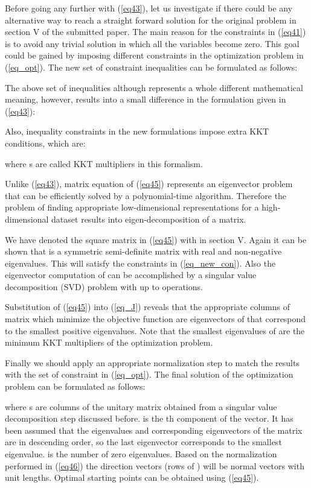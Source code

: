 \documentclass[10pt,journal,cspaper,compsoc]{IEEEtran}
\begin{document}
Before going any further with (\ref{eq43}), let us investigate if there could be any alternative way to reach a straight forward solution for the original problem in section V of the submitted paper. The main reason for the constraints in (\ref{eq41}) is to avoid any trivial solution in which all the variables become zero. This goal could be gained by imposing different constraints in the optimization problem in (\ref{eq_opt}). The new set of constraint inequalities can be formulated as follows:


The above set of inequalities although represents a whole different mathematical meaning, however, results into a small difference in the formulation given in (\ref{eq43}):


Also, inequality constraints in the new formulations impose extra KKT conditions, which are:

where s are called KKT multipliers in this formalism.

Unlike (\ref{eq43}), matrix equation of (\ref{eq45}) represents an eigenvector problem that can be efficiently solved by a polynomial-time algorithm. Therefore the problem of finding appropriate low-dimensional representations for a high-dimensional dataset results into eigen-decomposition of a  matrix.

We have denoted the square  matrix  in (\ref{eq45}) with  in section V. Again it can be shown that  is a symmetric semi-definite matrix with real and non-negative eigenvalues. This will satisfy the constraints in (\ref{eq_new_con}). Also the eigenvector computation of  can be accomplished by a singular value decomposition (SVD) problem with up to  operations.
 
Substitution of (\ref{eq45}) into (\ref{eq_J}) reveals that the appropriate columns of  matrix which minimize the objective function are  eigenvectors of  that correspond to the  smallest positive eigenvalues. Note that the  smallest eigenvalues of  are the minimum KKT multipliers of the optimization problem. 

Finally we should apply an appropriate normalization step to match the results with the set of constraint in (\ref{eq_opt}). The final solution of the optimization problem can be formulated as follows:

where s are columns of the unitary matrix  obtained from a singular value decomposition step discussed before.  is the th component of the  vector. It has been assumed that the eigenvalues and corresponding eigenvectors of the  matrix are in descending order, so the last eigenvector corresponds to the smallest eigenvalue.  is the number of zero eigenvalues. Based on the normalization performed in (\ref{eq46}) the direction vectors (rows of ) will be normal vectors with unit lengths. Optimal starting points can be obtained using (\ref{eq45}).
\end{document}
